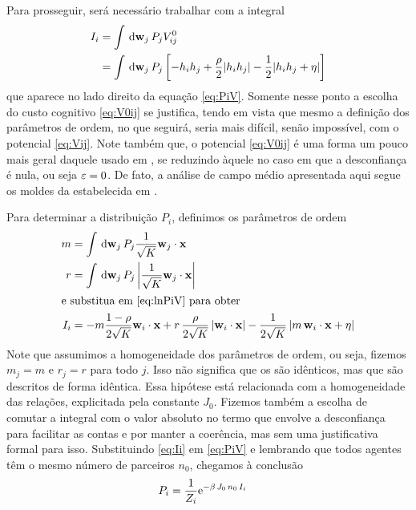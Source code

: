 Para prosseguir, será necessário trabalhar com a integral
\begin{align}
  I_i & = \int \msr{\agt{j}}P_j V^0_{ij} \notag\\
      & = \int \msr{\agt{j}}P_j \inbk{-h_ih_j + \frac{\rho}{2}|h_ih_j| - \half|h_ih_j+\cutoff|} \label{eq:lnPiV}
\end{align}
que aparece no lado direito da equação \eqref{eq:PiV}.
Somente nesse ponto a escolha do custo cognitivo \eqref{eq:V0ij} se justifica, tendo em vista que mesmo a definição dos parâmetros de ordem, no que seguirá, seria mais difícil, senão impossível, com o potencial \eqref{eq:Vij}.
Note também que, o potencial \eqref{eq:V0ij} é uma forma um pouco mais geral daquele usado em \parencite{Caticha2011}, se reduzindo àquele no caso em que a desconfiança é nula, ou seja $\varepsilon = 0$.
De fato, a análise de campo médio apresentada aqui segue os moldes da estabelecida em \parencite{Caticha2011,Cesar2014}.

Para determinar a distribuição $P_i$, definimos os parâmetros de ordem
\begin{align}
  m & = \int \msr{\agt{j}} P_j \opn{j}{\qst} \label{eq:m-def} \\
  r & = \int \msr{\agt{j}} P_j \left|\opn{j}{\qst}\right| \label{eq:r-def}\\
\intertext{e substitua em \eqref{eq:lnPiV} para obter}
  I_i & = -m{1-\rho \over 2 \sqrt{K}}\agt{i}\cdot\qst
          +r\,\frac{\rho}{2\sqrt{K}}\left|\agt{i}\cdot\qst\right|
          - {1\over 2 \sqrt{K}}\left|m\,\agt{i}\cdot\qst+\cutoff\right| \label{eq:Ii}
\end{align}
Note que assumimos a homogeneidade dos parâmetros de ordem, ou seja, fizemos $m_j = m$ e $r_j = r$ para todo $j$.
Isso não  significa que os são idênticos, mas que são descritos de forma idêntica.
Essa hipótese está relacionada com a homogeneidade das relações, explicitada pela constante $J_0$.
Fizemos também a escolha de comutar a integral com o valor absoluto no termo que envolve a desconfiança para facilitar as contas e por manter a coerência, mas sem uma justificativa formal para isso.
Substituindo \eqref{eq:Ii} em \eqref{eq:PiV} e lembrando que todos agentes têm o mesmo número de parceiros $n_0$, chegamos à conclusão
\begin{align}
  P_i & = \frac{1}{Z_i}\EulerE^{-\beta\,J_0\,n_0\,I_i} \label{eq:Piw}
\end{align}

